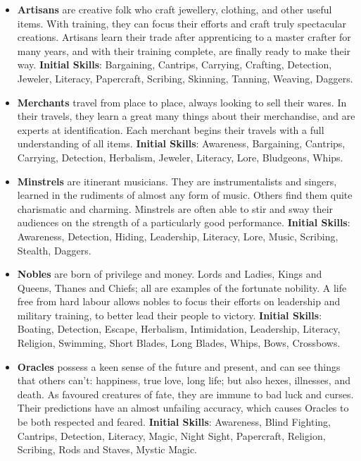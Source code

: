 \begin{itemize}
\item {\bf Artisans} are creative folk who craft jewellery, clothing, and 
other useful items.  With training, they can focus their efforts and craft 
truly spectacular creations.  Artisans learn their trade after apprenticing
to a master crafter for many years, and with their training complete, are
finally ready to make their way.  \textbf{Initial Skills}: Bargaining,
Cantrips, Carrying, Crafting, Detection, Jeweler, Literacy, Papercraft, 
Scribing, Skinning, Tanning, Weaving, Daggers.

\item {\bf Merchants} travel from place to place, always looking to sell 
their wares.  In their travels, they learn a great many things about their 
merchandise, and are experts at identification.  Each merchant begins their
travels with a full understanding of all items.
\textbf{Initial Skills}: Awareness, Bargaining, Cantrips, Carrying,
Detection, Herbalism, Jeweler, Literacy, Lore, Bludgeons, Whips.

\item {\bf Minstrels} are itinerant musicians.  They are instrumentalists 
and singers, learned in the rudiments of almost any form of music.  Others 
find them quite charismatic and charming.  Minstrels are often able to stir
and sway their audiences on the strength of a particularly good performance.
\textbf{Initial Skills}: Awareness, Detection, Hiding, Leadership, 
Literacy, Lore, Music, Scribing, Stealth, Daggers.

\item {\bf Nobles} are born of privilege and money.  Lords and Ladies, 
Kings and Queens, Thanes and Chiefs; all are examples of the fortunate 
nobility.  A life free from hard labour allows nobles to focus their 
efforts on leadership and military training, to better lead their people 
to victory.  \textbf{Initial Skills}: Boating, Detection, Escape, 
Herbalism, Intimidation, Leadership, Literacy, Religion, Swimming, 
Short Blades, Long Blades, Whips, Bows, Crossbows.

\item {\bf Oracles} possess a keen sense of the future and present, and can
see things that others can't: happiness, true love, long life; but also 
hexes, illnesses, and death.  As favoured creatures of fate, they are 
immune to bad luck and curses.  Their predictions have an almost unfailing 
accuracy, which causes Oracles to be both respected and feared.
\textbf{Initial Skills}: Awareness, Blind Fighting, Cantrips, Detection,
Literacy, Magic, Night Sight, Papercraft, Religion, Scribing, Rods and
Staves, Mystic Magic.


\end{itemize}
